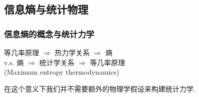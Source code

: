 \documentclass[12pt,hyperref={CJKbookmarks=true}]{beamer}
\begin{document}
\subsection{信息熵与统计物理} %
\label{sub:Info_entropy_and_thermo}
\begin{frame}
    \frametitle{信息熵的概念与统计力学}
    \begin{minipage}[t]{0.65\linewidth}
    等几率原理 $\Rightarrow$ 热力学关系 $\Rightarrow$ 熵\\
    {\center v.s.}
    熵 $\Rightarrow$ 统计学关系 $\Rightarrow$ 等几率原理 \\
    (Maximum entropy thermodynamics)\pause


    在这个意义下我们并不需要额外的物理学假设来构建统计力学\cite{ITSM.PhysRev.106.620,ITSM2.PhysRev.108.171}.



\end{minipage}
\end{frame}
\end{document}
